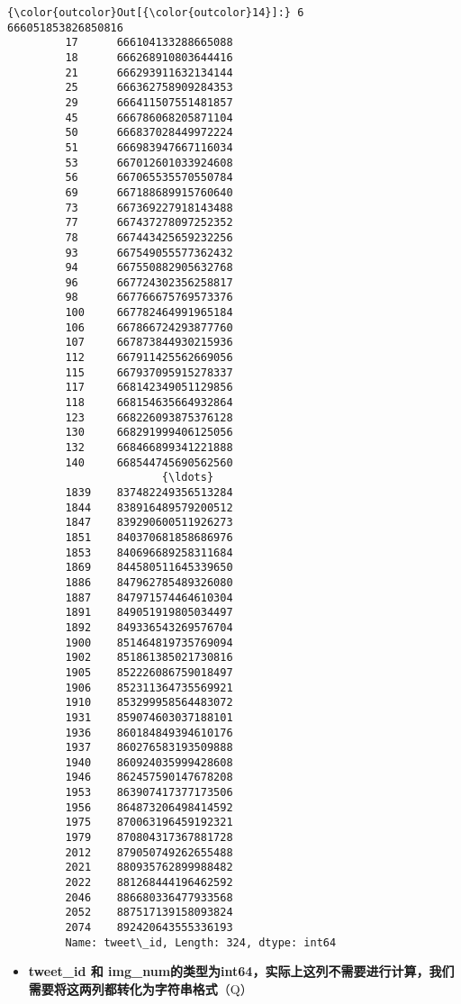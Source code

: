 \documentclass[11pt]{article}
\providecommand{\tightlist}{%
      \setlength{\itemsep}{0pt}\setlength{\parskip}{0pt}}
\begin{document}
\begin{Verbatim}[commandchars=\\\{\}]
{\color{outcolor}Out[{\color{outcolor}14}]:} 6       666051853826850816
         17      666104133288665088
         18      666268910803644416
         21      666293911632134144
         25      666362758909284353
         29      666411507551481857
         45      666786068205871104
         50      666837028449972224
         51      666983947667116034
         53      667012601033924608
         56      667065535570550784
         69      667188689915760640
         73      667369227918143488
         77      667437278097252352
         78      667443425659232256
         93      667549055577362432
         94      667550882905632768
         96      667724302356258817
         98      667766675769573376
         100     667782464991965184
         106     667866724293877760
         107     667873844930215936
         112     667911425562669056
         115     667937095915278337
         117     668142349051129856
         118     668154635664932864
         123     668226093875376128
         130     668291999406125056
         132     668466899341221888
         140     668544745690562560
                        {\ldots}        
         1839    837482249356513284
         1844    838916489579200512
         1847    839290600511926273
         1851    840370681858686976
         1853    840696689258311684
         1869    844580511645339650
         1886    847962785489326080
         1887    847971574464610304
         1891    849051919805034497
         1892    849336543269576704
         1900    851464819735769094
         1902    851861385021730816
         1905    852226086759018497
         1906    852311364735569921
         1910    853299958564483072
         1931    859074603037188101
         1936    860184849394610176
         1937    860276583193509888
         1940    860924035999428608
         1946    862457590147678208
         1953    863907417377173506
         1956    864873206498414592
         1975    870063196459192321
         1979    870804317367881728
         2012    879050749262655488
         2021    880935762899988482
         2022    881268444196462592
         2046    886680336477933568
         2052    887517139158093824
         2074    892420643555336193
         Name: tweet\_id, Length: 324, dtype: int64
\end{Verbatim}
            
    \begin{itemize}
\tightlist
\item
  \textbf{tweet\_id 和
  img\_num的类型为int64，实际上这列不需要进行计算，我们需要将这两列都转化为字符串格式}（Q）
\end{itemize}
\end{document}
